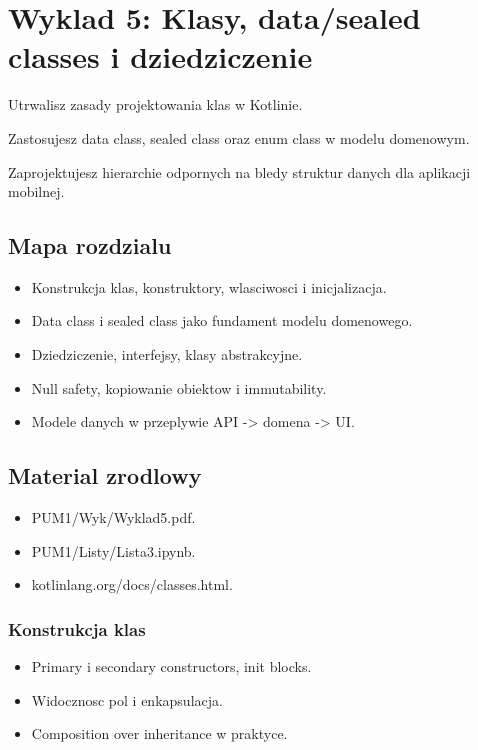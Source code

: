 \chapter{Wyklad 5: Klasy, data/sealed classes i dziedziczenie}

\begin{learningobjectives}
  \item Utrwalisz zasady projektowania klas w Kotlinie.
  \item Zastosujesz data class, sealed class oraz enum class w modelu domenowym.
  \item Zaprojektujesz hierarchie odpornych na bledy struktur danych dla aplikacji mobilnej.
\end{learningobjectives}

\section{Mapa rozdzialu}
\begin{itemize}
  \item Konstrukcja klas, konstruktory, wlasciwosci i inicjalizacja.
  \item Data class i sealed class jako fundament modelu domenowego.
  \item Dziedziczenie, interfejsy, klasy abstrakcyjne.
  \item Null safety, kopiowanie obiektow i immutability.
  \item Modele danych w przeplywie API -> domena -> UI.
\end{itemize}

\section{Material zrodlowy}
\begin{itemize}
  \item PUM1/Wyk/Wyklad5.pdf.
  \item PUM1/Listy/Lista3.ipynb.
  \item kotlinlang.org/docs/classes.html.
\end{itemize}

\subsection{Konstrukcja klas}
\begin{itemize}
  \item Primary i secondary constructors, init blocks.
  \item Widocznosc pol i enkapsulacja.
  \item Composition over inheritance w praktyce.
\end{itemize}


